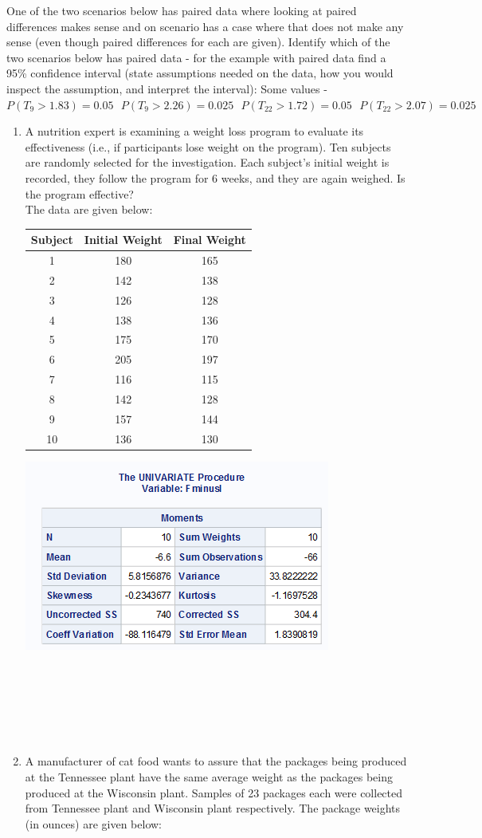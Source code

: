 \newpage

One of the two scenarios below has paired data where looking at paired differences makes sense and on scenario has a case where that does not make any sense (even though paired differences for each are given).  Identify which of the two scenarios below has paired data - for the example with paired data find a 95\% confidence interval (state assumptions needed on the data, how you would inspect the assumption, and interpret the interval):  Some values - $P(T_9>1.83)=0.05~~~P(T_9>2.26)=0.025~~~P(T_{22}>1.72)=0.05~~~P(T_{22}>2.07)=0.025$
\begin{enumerate}
\item A nutrition expert is examining a weight loss program to evaluate its effectiveness (i.e., if participants lose weight on the program). Ten subjects are randomly selected for the investigation. Each subject’s initial weight is recorded, they follow the program for 6 weeks, and they are again weighed. Is the program effective?\\
The data are given below:
\begin{multicols}{2}
\begin{tabular}{c|cc}
Subject	&Initial Weight	&Final Weight\\\hline
1&	180&	165\\
2&	142&	138\\
3&	126&	128\\
4&	138&	136\\
5&	175&	170\\
6&	205&	197\\
7&	116&	115\\
8&	142&	128\\
9&	157&	144\\
10&	136&	130\\
\end{tabular}
\columnbreak
\includegraphics[scale=0.8]{weightdiff}
\end{multicols}
~\\~\\~\\~\\~\\
\item A manufacturer of cat food wants to assure that the packages being produced at the Tennessee plant have the same average weight as the packages being produced at the Wisconsin plant. Samples of 23 packages each were collected from Tennessee plant and Wisconsin plant respectively. The package weights (in ounces) are given below:
\end{enumerate}
